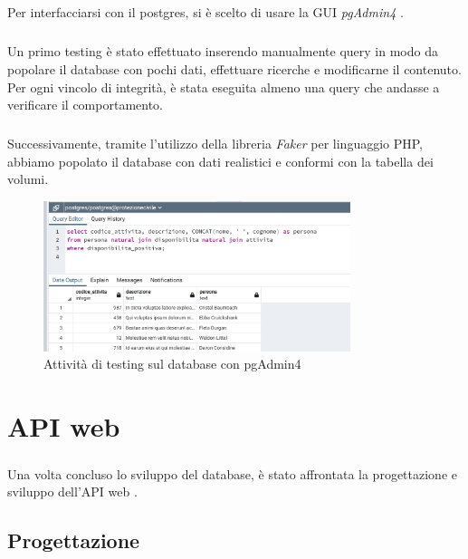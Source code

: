 \documentclass[12pt,a4paper,twoside,english,italian]{book}
\begin{document}
\paragraph{} Per interfacciarsi con il postgres, si è scelto di usare la GUI \emph{pgAdmin4} \cite{pgadmin}.

\paragraph{} Un primo testing è stato effettuato inserendo manualmente query in modo da popolare il database con pochi dati, effettuare ricerche e modificarne il contenuto. Per ogni vincolo di integrità, è stata eseguita almeno una query che andasse a verificare il comportamento. 

\paragraph{} Successivamente, tramite l'utilizzo della libreria \emph{Faker} per linguaggio PHP, abbiamo popolato il database con dati realistici e conformi con la tabella dei volumi.

\begin{figure}[H]
    \centering
    \includegraphics[width=0.8\textwidth]{img/query_esempio.png}
    \caption{Attività di testing sul database con pgAdmin4}
\end{figure}



\chapter{API web}

\paragraph{} Una volta concluso lo sviluppo del database, è stato affrontata la progettazione e sviluppo dell'API web \cite{restapi}.

\section{Progettazione}
\end{document}
